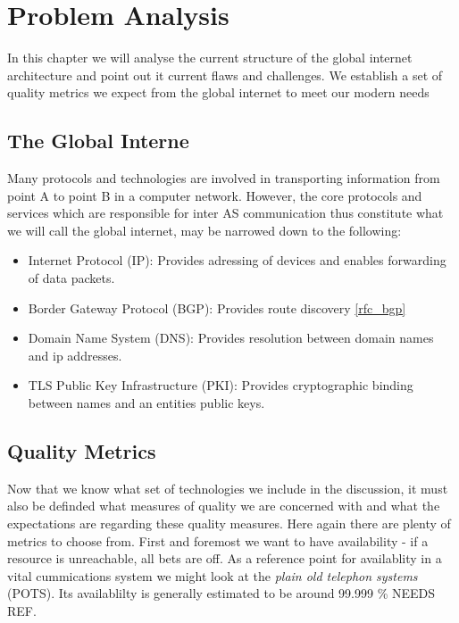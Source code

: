 \documentclass[../eva1_scion.tex]{subfiles}
\begin{document}
\chapter{Problem Analysis}\label{ch:analysis}

In this chapter we will analyse the current structure of the global internet architecture and point out it current flaws and challenges. We establish a set of quality metrics we expect from the global internet to meet our modern needs

\section{The Global Interne}%
\label{sec:the_global_internet}

Many protocols and technologies are involved in transporting information from point A to point B in a computer network. However, the core protocols and services which are responsible for inter AS  communication thus constitute what we will call the global internet, may be narrowed down to the following:

\begin{itemize}
    \item Internet Protocol (IP): Provides adressing of devices and enables forwarding of data packets.
    \item Border Gateway Protocol (BGP): Provides route discovery \ref{rfc_bgp}
    \item Domain Name System (DNS): Provides resolution between domain names and ip addresses.
    \item TLS Public Key Infrastructure (PKI): Provides cryptographic binding between names and an entities public keys.
\end{itemize}

\section{Quality Metrics}%
\label{sec:quality_metrics}

Now that we know what set of technologies we include in the discussion, it must also be definded what measures of quality we are concerned with and what the expectations are regarding these quality measures. Here again there are plenty of metrics to choose from. First and foremost we want to have availability - if a resource is unreachable, all bets are off. As a reference point for availablity in a vital cummications system we might look at the \textit{plain old telephon systems} (POTS). Its availablilty is generally estimated to be around 99.999 \% NEEDS REF.
\end{document}
